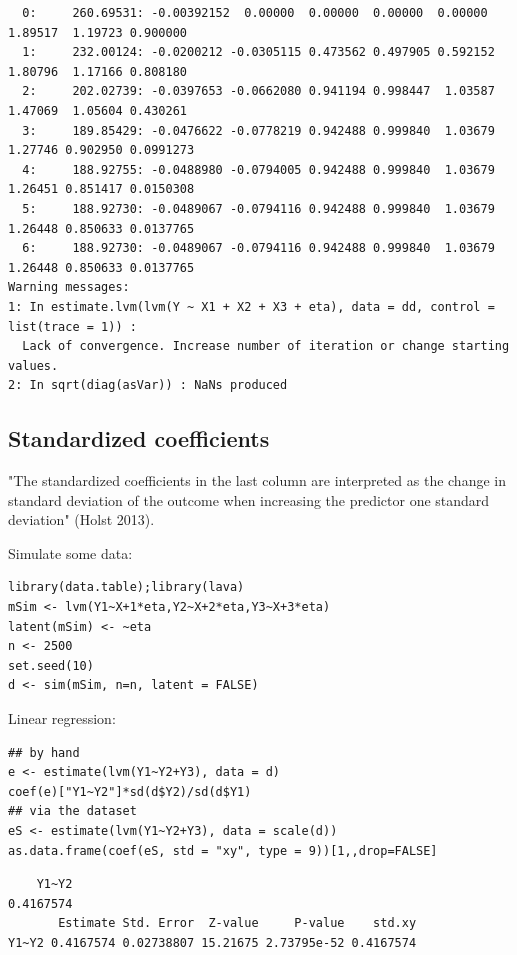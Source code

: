 \documentclass{article}
\begin{document}
\begin{verbatim}
  0:     260.69531: -0.00392152  0.00000  0.00000  0.00000  0.00000  1.89517  1.19723 0.900000
  1:     232.00124: -0.0200212 -0.0305115 0.473562 0.497905 0.592152  1.80796  1.17166 0.808180
  2:     202.02739: -0.0397653 -0.0662080 0.941194 0.998447  1.03587  1.47069  1.05604 0.430261
  3:     189.85429: -0.0476622 -0.0778219 0.942488 0.999840  1.03679  1.27746 0.902950 0.0991273
  4:     188.92755: -0.0488980 -0.0794005 0.942488 0.999840  1.03679  1.26451 0.851417 0.0150308
  5:     188.92730: -0.0489067 -0.0794116 0.942488 0.999840  1.03679  1.26448 0.850633 0.0137765
  6:     188.92730: -0.0489067 -0.0794116 0.942488 0.999840  1.03679  1.26448 0.850633 0.0137765
Warning messages:
1: In estimate.lvm(lvm(Y ~ X1 + X2 + X3 + eta), data = dd, control = list(trace = 1)) :
  Lack of convergence. Increase number of iteration or change starting values.
2: In sqrt(diag(asVar)) : NaNs produced
\end{verbatim}

\subsection{Standardized coefficients}
\label{sec:orgdae2960}

"The standardized coefficients in the last column are interpreted as
the change in standard deviation of the outcome when increasing the
predictor one standard deviation" (Holst 2013).

\bigskip

Simulate some data:
\lstset{language=r,label= ,caption= ,captionpos=b,numbers=none}
\begin{lstlisting}
library(data.table);library(lava)
mSim <- lvm(Y1~X+1*eta,Y2~X+2*eta,Y3~X+3*eta)
latent(mSim) <- ~eta
n <- 2500
set.seed(10)
d <- sim(mSim, n=n, latent = FALSE)
\end{lstlisting}

Linear regression:
\lstset{language=r,label= ,caption= ,captionpos=b,numbers=none}
\begin{lstlisting}
## by hand
e <- estimate(lvm(Y1~Y2+Y3), data = d)
coef(e)["Y1~Y2"]*sd(d$Y2)/sd(d$Y1)
## via the dataset
eS <- estimate(lvm(Y1~Y2+Y3), data = scale(d))
as.data.frame(coef(eS, std = "xy", type = 9))[1,,drop=FALSE]
\end{lstlisting}

\begin{verbatim}
    Y1~Y2 
0.4167574
       Estimate Std. Error  Z-value     P-value    std.xy
Y1~Y2 0.4167574 0.02738807 15.21675 2.73795e-52 0.4167574
\end{verbatim}
\end{document}
